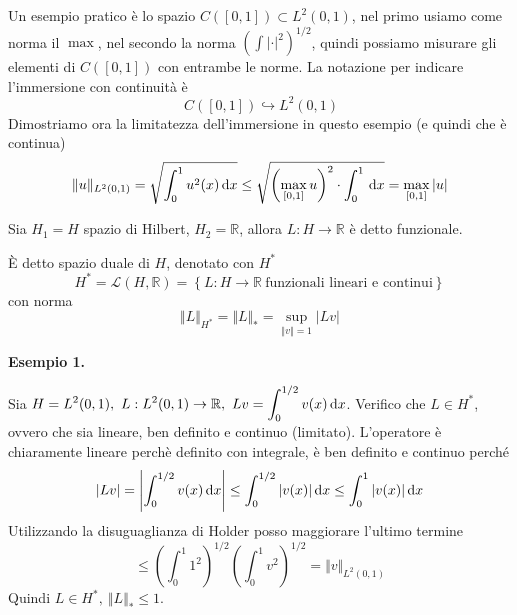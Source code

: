 Un esempio pratico è lo spazio $\displaystyle C([ 0,1]) \subset L^{2}(0,1)$, nel primo usiamo come norma il $\max$, nel secondo la norma $\left(\int | \cdot | ^{2}\right)^{1/2}$, quindi possiamo misurare gli elementi di $\displaystyle C([ 0,1])$ con entrambe le norme. La notazione per indicare l'immersione con continuità è
\begin{equation*}
    \ C([ 0,1]) \hookrightarrow L^{2}(0,1)
\end{equation*}
Dimostriamo ora la limitatezza dell'immersione in questo esempio (e quindi che è continua)
\begin{equation*}
    \Vert u\Vert _{L^{2}(0,1)} =\sqrt{\int ^{1}_{0} u^{2}(x) \,\mathrm d x} \leq \sqrt{\left(\max_{[ 0,1]} u\right)^{2} \cdot \int ^{1}_{0} \,\mathrm d x} =\max_{[ 0,1]}| u|
\end{equation*}
\begin{definition}
    [Funzionale] Sia $\displaystyle H_{1} =H$ spazio di Hilbert, $\displaystyle H_{2} =\mathbb{R}$, allora $\displaystyle L:H\rightarrow \mathbb{R}$ è detto funzionale.
\end{definition}
\begin{definition}
     È detto spazio duale di $H$, denotato con $\displaystyle H^{*}$
    \begin{equation*}
        H^{*} =\mathcal{L}(H,\mathbb{R}) =\left\{L:H\rightarrow \mathbb{R} \ \text{funzionali lineari e continui}\right\}
    \end{equation*}
    con norma
    \begin{equation*}
        \Vert L\Vert _{H^{*}} =\Vert L\Vert _{*} =\sup _{\Vert v\Vert =1}| Lv|
    \end{equation*}
\end{definition}
\textbf{Esempio 1.}

Sia $\displaystyle H=L^{2}(0,1),\ L:L^{2}(0,1)\rightarrow \mathbb{R},\ Lv=\int ^{1/2}_{0} v(x) \dx$. Verifico che $\displaystyle L\in H^{*}$, ovvero che sia lineare, ben definito e continuo (limitato). L'operatore è chiaramente lineare perchè definito con integrale, è ben definito e continuo perché
\begin{equation*}
    | Lv| =\left| \int ^{1/2}_{0} v(x) \,\mathrm d x\right| \leq \int ^{1/2}_{0}| v(x)| \,\mathrm d x\leq \int ^{1}_{0}| v(x)| \,\mathrm d x
\end{equation*}
Utilizzando la disuguaglianza di Holder posso maggiorare l'ultimo termine
\begin{equation*}
    \leq \left(\int ^{1}_{0} 1^{2}\right)^{1/2}\left(\int ^{1}_{0} v^{2}\right)^{1/2} =\Vert v\Vert _{L^{2}(0,1)}
\end{equation*}
Quindi $\displaystyle L\in H^{*},\ \Vert L\Vert _{*} \leq 1$.

